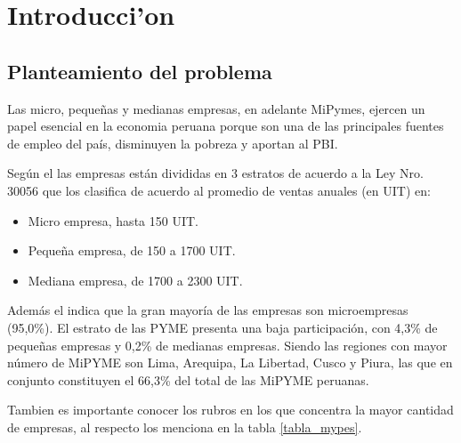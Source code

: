 
\chapter{Introducci'on}

\section{Planteamiento del problema}
Las micro, peque\~nas y medianas empresas, en adelante MiPymes, ejercen un papel
esencial en la economia peruana porque son una de las principales fuentes de empleo
del pa\'is, disminuyen la pobreza y aportan al PBI.

Seg\'un el \cite{produce2} las empresas est\'an divididas en 3 estratos de acuerdo
a la Ley Nro. 30056 que los clasifica de acuerdo al promedio de ventas anuales
(en UIT) en:
\begin{itemize}
    \item Micro empresa, hasta 150 UIT.
    \item Peque\~na empresa, de 150 a 1700 UIT.
    \item Mediana empresa, de 1700 a 2300 UIT.
\end{itemize}

Adem\'as el \cite{produce} indica que la gran mayor\'ia de las empresas son
microempresas (95,0\%). El estrato de las PYME presenta una baja participaci\'on,
con 4,3\% de peque\~nas empresas y 0,2\% de medianas empresas. Siendo las regiones
con mayor n\'umero de MiPYME son Lima, Arequipa, La Libertad, Cusco y Piura, las que
en conjunto constituyen el 66,3\% del total de las MiPYME peruanas.

Tambien es importante conocer los rubros en los que concentra la mayor cantidad
de empresas, al respecto \citep{produce} los menciona en la tabla \ref{tabla_mypes}.

